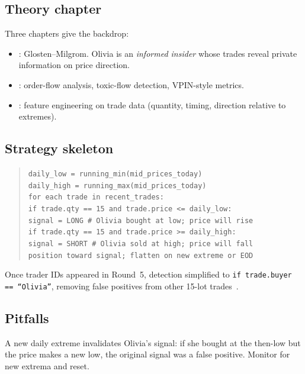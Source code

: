 \subsection{Theory chapter}

Three chapters give the backdrop:
\begin{itemize}
  \item {}: Glosten--Milgrom.  Olivia is an
  \emph{informed insider} whose trades reveal private information on
  price direction.
  \item {}: order-flow analysis, toxic-flow
  detection, VPIN-style metrics.
  \item {}: feature engineering on trade data
  (quantity, timing, direction relative to extremes).
\end{itemize}

\subsection{Strategy skeleton}

\begin{quote}
\texttt{daily\_low = running\_min(mid\_prices\_today)}\\
\texttt{daily\_high = running\_max(mid\_prices\_today)}\\
\texttt{for each trade in recent\_trades:}\\
\quad\texttt{if trade.qty == 15 and trade.price <= daily\_low:}\\
\qquad\texttt{signal = LONG  \# Olivia bought at low; price will rise}\\
\quad\texttt{if trade.qty == 15 and trade.price >= daily\_high:}\\
\qquad\texttt{signal = SHORT \# Olivia sold at high; price will fall}\\
\texttt{position toward signal; flatten on new extreme or EOD}
\end{quote}

\noindent
Once trader IDs appeared in Round~5, detection simplified to
\texttt{if trade.buyer == ``Olivia''}, removing false positives from
other 15-lot trades~\citep{frankfurthedgehogs2025}.

\subsection{Pitfalls}

\begin{pitfallbox}
A new daily extreme invalidates Olivia's signal: if she bought at
the then-low but the price makes a new low, the original signal was
a false positive.  Monitor for new extrema and reset.
\end{pitfallbox}

